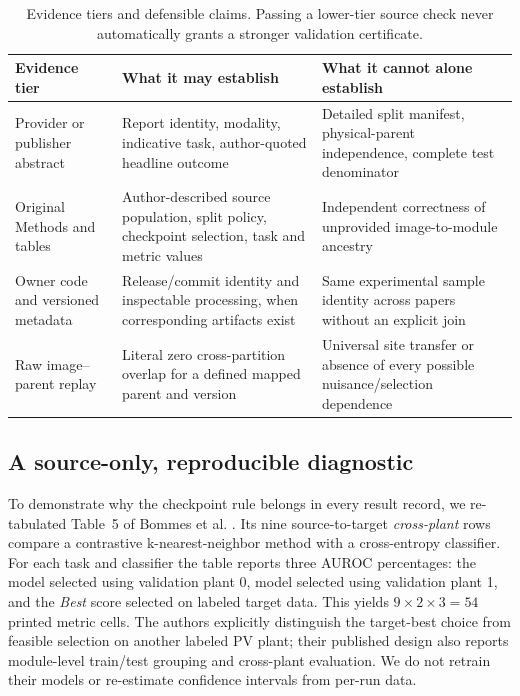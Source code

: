 \documentclass[10pt,a4paper]{article}
\begin{document}
\begin{table}[ht]
\centering\small
\caption{Evidence tiers and defensible claims. Passing a lower-tier source check never automatically grants a stronger validation certificate.}
\begin{tabularx}{\linewidth}{@{}p{2.25cm}X X@{}}
\toprule Evidence tier & What it may establish & What it cannot alone establish \\
\midrule Provider or publisher abstract & Report identity, modality, indicative task, author-quoted headline outcome & Detailed split manifest, physical-parent independence, complete test denominator \\
Original Methods and tables & Author-described source population, split policy, checkpoint selection, task and metric values & Independent correctness of unprovided image-to-module ancestry \\
Owner code and versioned metadata & Release/commit identity and inspectable processing, when corresponding artifacts exist & Same experimental sample identity across papers without an explicit join \\
Raw image--parent replay & Literal zero cross-partition overlap for a defined mapped parent and version & Universal site transfer or absence of every possible nuisance/selection dependence \\
\bottomrule
\end{tabularx}
\end{table}

\subsection{A source-only, reproducible diagnostic}
To demonstrate why the checkpoint rule belongs in every result record, we re-tabulated Table~5 of Bommes et al. \cite{bommes2022}. Its nine source-to-target \emph{cross-plant} rows compare a contrastive k-nearest-neighbor method with a cross-entropy classifier. For each task and classifier the table reports three AUROC percentages: the model selected using validation plant 0, model selected using validation plant 1, and the \emph{Best} score selected on labeled target data. This yields $9\times2\times3=54$ printed metric cells. The authors explicitly distinguish the target-best choice from feasible selection on another labeled PV plant; their published design also reports module-level train/test grouping and cross-plant evaluation. We do not retrain their models or re-estimate confidence intervals from per-run data.
\end{document}
